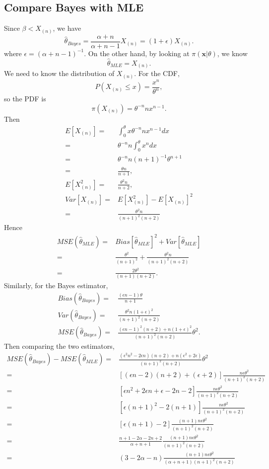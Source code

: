 \documentclass{article}
\begin{document}
\subsection{Compare Bayes with MLE}

Since $\beta < X_{(n)}$, we have
\[
  \hat{\theta}_{Bayes} = \frac{\alpha+n}{\alpha+n-1} X_{(n)} = (1+\epsilon) X_{(n)}.
\]
where $\epsilon = (\alpha + n -1)^{-1}$.
On the other hand, by looking at $\pi(\bm{x} | \theta)$,
we know
\[
  \hat{\theta}_{MLE} = X_{(n)}.
\]
We need to know the distribution of $X_{(n)}$.
For the CDF,
\[
  P(X_{(n)} \leq x) = \frac{x^n}{\theta^n},
\]
so the PDF is
\[
  \pi(X_{(n)}) = \theta^{-n} n x^{n-1}.
\]
Then
\begin{align*}
  E[X_{(n)}]
  = & \int_0^\theta x \theta^{-n} n x^{n-1} dx \\
  = & \theta^{-n} n \int_0^\theta x^{n} dx \\
  = & \theta^{-n} n (n+1)^{-1} \theta^{n+1}\\
  = & \frac{\theta n}{n+1}, \\
  E[X_{(n)}^2]
  = & \frac{\theta^2 n}{n+2}, \\
  Var[X_{(n)}]
  = & E[X_{(n)}^2] - E[X_{(n)}]^2 \\
  = & \frac{\theta^2 n}{(n+1)^2(n+2)}
\end{align*}
Hence
\begin{align*}
  MSE(\hat{\theta}_{MLE}) =
  & Bias[\hat{\theta}_{MLE}]^2 + Var[\hat{\theta}_{MLE}] \\
  = & \frac{\theta^2}{(n+1)^2} + \frac{\theta^2 n}{(n+1)^2(n+2)} \\
  = & \frac{2 \theta^2}{(n+1)(n+2)}.
\end{align*}
Similarly, for the Bayes estimator,
\begin{align*}
  Bias(\hat{\theta}_{Bayes})
  = & \frac{(\epsilon n - 1)\theta}{n+1} \\
  Var(\hat{\theta}_{Bayes})
  = & \frac{\theta^2 n (1+\epsilon)^2}{(n+1)^2(n+2)} \\
  MSE(\hat{\theta}_{Bayes})
  = & \frac{(\epsilon n - 1)^2(n+2) + n(1+\epsilon)^2}{(n+1)^2(n+2)} \theta^2.
\end{align*}
Then comparing the two estimators,
\begin{align*}
  MSE(\hat{\theta}_{Bayes}) - MSE(\hat{\theta}_{MLE}) 
  = & \frac{(\epsilon^2 n^2 - 2\epsilon n)(n+2) + n(\epsilon^2 + 2\epsilon)}{(n+1)^2(n+2)} \theta^2 \\
  = & [(\epsilon n - 2)(n+2) + (\epsilon + 2)] \frac{n \epsilon\theta^2}{(n+1)^2(n+2)} \\
  = & [\epsilon n^2 + 2\epsilon n + \epsilon -2n -2 ] \frac{n \epsilon\theta^2}{(n+1)^2(n+2)} \\
  = & [\epsilon (n+1)^2 -2(n+1)] \frac{n \epsilon\theta^2}{(n+1)^2(n+2)} \\
  = & [\epsilon (n+1) -2] \frac{(n+1)n \epsilon\theta^2}{(n+1)^2(n+2)} \\
  = & \frac{n+1-2\alpha-2n+2}{\alpha+n+1} \frac{(n+1)n \epsilon\theta^2}{(n+1)^2(n+2)} \\
  = & (3-2\alpha-n) \frac{(n+1)n \epsilon\theta^2}{(\alpha+n+1)(n+1)^2(n+2)} 
\end{align*}
\end{document}
